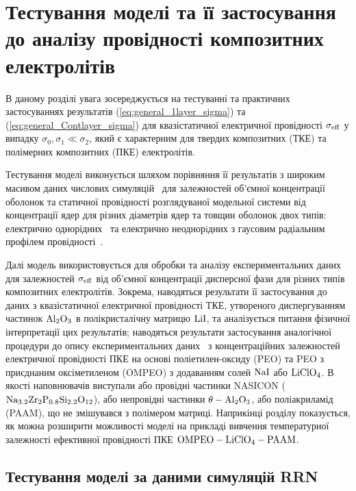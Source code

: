 \documentclass[14pt,twoside]{vakthesis}
\begin{document}
\chapter{Тестування моделі та її застосування до аналізу провідності композитних електролітів}\label{sec:RRN-electrol}

В даному розділі увага зосереджується на тестуванні та практичних застосуваннях результатів (\ref{eq:general_1layer_sigma}) та (\ref{eq:general_Contlayer_sigma}) для квазістатичної електричної провідності $\sigma_{\rm eff}$ у випадку $\sigma_{0}, \sigma_1 \ll \sigma_2$, який є характерним для твердих композитних (ТКЕ) та полімерних композитних (ПКЕ) електролітів.

Тестування моделі виконується шляхом порівняння її результатів з широким масивом даних числових симуляцій~\cite{Siekierski2005, Siekierski2006, Siekierski2007} для залежностей об'ємної концентрації оболонок та статичної провідності розглядуваної модельної системи від концентрації ядер для різних діаметрів ядер та товщин оболонок двох типів: електрично однорідних~\cite{Siekierski2005, Siekierski2007} та електрично неоднорiдних з гаусовим радіальним профілем провідності~\cite{Siekierski2006}.

Далі модель використовується для обробки та аналізу експериментальних даних для залежностей $\sigma_{\rm eff}$ від об'ємної концентрації дисперсної фази для різних типів композитних електролітів. Зокрема, наводяться результати її застосування до даних \cite{Liang1973} з квазістатичної електричної провідності ТКЕ, утвореного диспергуванням частинок $\rm Al_2O_3$ в полікристалічну матрицю $\rm LiI$, та аналізується питання фізичної інтерпретації цих результатів;
наводяться результати застосування аналогічної процедури до опису експериментальних даних~\cite{Przl1995, Wiec1994} з концентраційних залежностей електричної провідності ПКЕ на основі поліетилен-оксиду (PEO) та PEO з приєднаним оксіметиленом (OMPEO) з додаванням солей $\rm NaI$ або $\rm LiClO_4$. В якості наповнювачів виступали або провідні частинки NASICON ($\rm Na_{3.2} Zr_2P_{0.8} Si_{2.2} O_{12}$), або непровідні частинки $\rm \theta -Al_2O_3$, або поліакриламід (PAAM), що не змішувався з полімером матриці. Наприкінці розділу показується, як можна розширити можливості моделі на прикладі вивчення температурної залежності ефективної провідності ПКЕ $\rm OMPEO-LiClO_4-PAAM$.



\section{Тестування моделі за даними симуляцій RRN}\label{sec:RRN-test}
\end{document}
